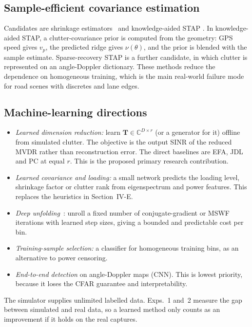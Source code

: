 \documentclass[conference]{IEEEtran}
\newcommand{\vect}[1]{\mathbf{#1}}
\begin{document}
\subsection{Sample-efficient covariance estimation}
Candidates are shrinkage estimators~\cite{ledoit2004} and knowledge-aided STAP
\cite{guerci2006}. In knowledge-aided STAP, a clutter-covariance prior is computed from the
geometry: GPS speed gives $v_p$, the predicted ridge gives $\nu(\theta)$, and the prior is blended
with the sample estimate. Sparse-recovery STAP is a further candidate, in which clutter is
represented on an angle-Doppler dictionary. These methods reduce the dependence on homogeneous
training, which is the main real-world failure mode for road scenes with discretes and lane
edges.

\subsection{Machine-learning directions}
\begin{itemize}
\item \emph{Learned dimension reduction:} learn $\vect T\in\mathbb C^{D\times r}$ (or a
generator for it) offline from simulated clutter. The objective is the output SINR of the
reduced MVDR rather than reconstruction error. The direct baselines are EFA, JDL and PC at
equal $r$. This is the proposed primary research contribution.
\item \emph{Learned covariance and loading:} a small network predicts the loading level,
shrinkage factor or clutter rank from eigenspectrum and power features. This replaces the
heuristics in Section~IV-E.
\item \emph{Deep unfolding}~\cite{monga2021}: unroll a fixed number of conjugate-gradient or MSWF
iterations with learned step sizes, giving a bounded and predictable cost per bin.
\item \emph{Training-sample selection:} a classifier for homogeneous training bins, as an
alternative to power censoring.
\item \emph{End-to-end detection} on angle-Doppler maps (CNN). This is lowest priority, because it
loses the CFAR guarantee and interpretability.
\end{itemize}
The simulator supplies unlimited labelled data. Exps.~1 and~2 measure the gap between simulated
and real data, so a learned method only counts as an improvement if it holds on the real
captures.

\end{document}
